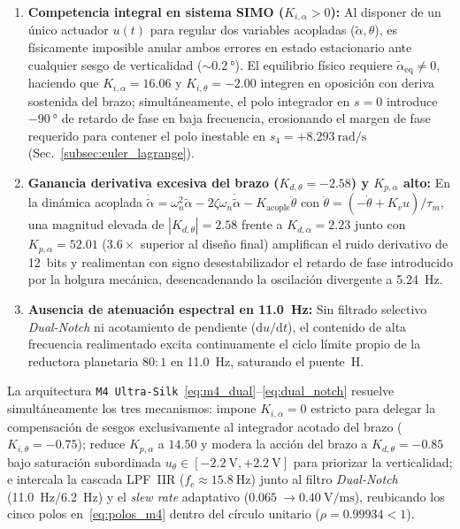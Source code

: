 \begin{enumerate}
    \item \textbf{Competencia integral en sistema SIMO ($K_{i,\alpha}>0$):} Al disponer de un único actuador $u(t)$ para regular dos variables acopladas ($\tilde{\alpha},\theta$), es físicamente imposible anular ambos errores en estado estacionario ante cualquier sesgo de verticalidad ($\sim\qty{0.2}{\degree}$). El equilibrio físico requiere $\tilde{\alpha}_{\text{eq}}\neq 0$, haciendo que $K_{i,\alpha}=16.06$ y $K_{i,\theta}=-2.00$ integren en oposición con deriva sostenida del brazo; simultáneamente, el polo integrador en $s=0$ introduce $-\qty{90}{\degree}$ de retardo de fase en baja frecuencia, erosionando el margen de fase requerido para contener el polo inestable en $s_4 = +\qty{8.293}{\radian\per\second}$ (Sec.~\ref{subsec:euler_lagrange}).
    \item \textbf{Ganancia derivativa excesiva del brazo ($K_{d,\theta}=-2.58$) y $K_{p,\alpha}$ alto:} En la dinámica acoplada $\ddot{\tilde{\alpha}} = \omega_n^2\tilde{\alpha} - 2\zeta\omega_n\dot{\tilde{\alpha}} - K_{\text{acople}}\ddot{\theta}$ con $\ddot{\theta} = (-\dot{\theta}+K_v u)/\tau_m$, una magnitud elevada de $|K_{d,\theta}|=2.58$ frente a $K_{d,\alpha}=2.23$ junto con $K_{p,\alpha}=52.01$ ($3.6\times$ superior al diseño final) amplifican el ruido derivativo de 12~bits y realimentan con signo desestabilizador el retardo de fase introducido por la holgura mecánica, desencadenando la oscilación divergente a \qty{5.24}{\hertz}.
    \item \textbf{Ausencia de atenuación espectral en \qty{11.0}{\hertz}:} Sin filtrado selectivo \textit{Dual-Notch} ni acotamiento de pendiente ($\mathrm{d}u/\mathrm{d}t$), el contenido de alta frecuencia realimentado excita continuamente el ciclo límite propio de la reductora planetaria $80:1$ en \qty{11.0}{\hertz}, saturando el puente~H.
\end{enumerate}

La arquitectura \texttt{M4 Ultra-Silk}~\eqref{eq:m4_dual}--\eqref{eq:dual_notch} resuelve simultáneamente los tres mecanismos: impone $K_{i,\alpha}=0$ estricto para delegar la compensación de sesgos exclusivamente al integrador acotado del brazo ($K_{i,\theta}=-0.75$); reduce $K_{p,\alpha}$ a $14.50$ y modera la acción del brazo a $K_{d,\theta}=-0.85$ bajo saturación subordinada $u_\theta \in [-\qty{2.2}{\volt}, +\qty{2.2}{\volt}]$ para priorizar la verticalidad; e intercala la cascada LPF~IIR ($f_c\approx\qty{15.8}{\hertz}$) junto al filtro \textit{Dual-Notch} (\qty{11.0}{\hertz}/\qty{6.2}{\hertz}) y el \textit{slew rate} adaptativo ($\qty{0.065}{}\to\qty{0.40}{\volt\per\milli\second}$), reubicando los cinco polos en~\eqref{eq:polos_m4} dentro del círculo unitario ($\rho = 0.99934 < 1$).

